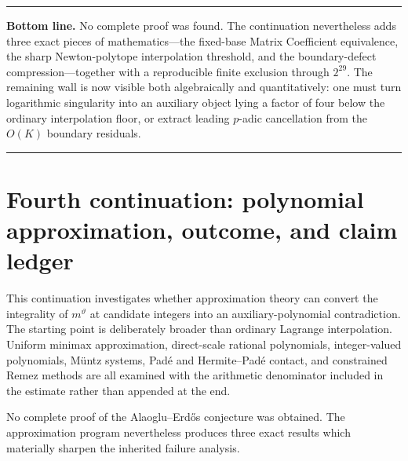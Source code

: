 \documentclass[11pt,oneside]{article}
\theoremstyle{definition}
\theoremstyle{remark}
\newcommand{\thetaq}{\vartheta}
\newenvironment{resultbox}
{\begin{center}\begin{minipage}{0.94\textwidth}\hrule\vspace{0.45em}}
{\vspace{0.35em}\hrule\end{minipage}\end{center}}
\begin{document}
\begin{resultbox}
\textbf{Bottom line.}
No complete proof was found.  The continuation nevertheless adds three exact pieces of
mathematics---the fixed-base Matrix Coefficient equivalence, the sharp Newton-polytope
interpolation threshold, and the boundary-defect compression---together with a reproducible
finite exclusion through $2^{29}$.  The remaining wall is now visible both algebraically and
quantitatively: one must turn logarithmic singularity into an auxiliary object lying a factor
of four below the ordinary interpolation floor, or extract leading $p$-adic cancellation from
the $O(K)$ boundary residuals.
\end{resultbox}

\clearpage
\setcounter{section}{0}
\renewcommand{\thesection}{P\arabic{section}}
\renewcommand{\theHsection}{P\arabic{section}}

\section{Fourth continuation: polynomial approximation, outcome, and claim ledger}
\label{pa:sec-outcome}

This continuation investigates whether approximation theory can convert the integrality of
\(m^{\thetaq}\) at candidate integers into an auxiliary-polynomial contradiction.  The
starting point is deliberately broader than ordinary Lagrange interpolation.  Uniform
minimax approximation, direct-scale rational polynomials, integer-valued polynomials,
M\"untz systems, Pad\'e and Hermite--Pad\'e contact, and constrained Remez methods are all
examined with the arithmetic denominator included in the estimate rather than appended at the
end.

No complete proof of the Alaoglu--Erd\H{o}s conjecture was obtained.  The approximation
program nevertheless produces three exact results which materially sharpen the inherited
failure analysis.
\end{document}
